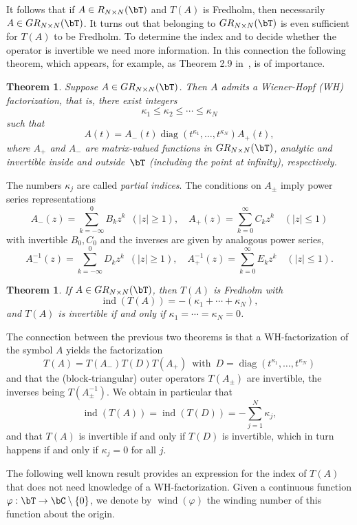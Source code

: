 \documentclass[addpoints,12pt,letter]{article}
\DeclareMathOperator{\diag}{diag}
\DeclareMathOperator{\ind}{ind}
\DeclareMathOperator{\wind}{wind}
\newcommand{\ka}{\kappa}
\newcommand{\nf}{\infty}
\newcommand{\ph}{\varphi}
\newcommand{\sm}{\setminus}
\renewcommand{\ge}{\geqslant}
\renewcommand{\le}{\leqslant}
\numberwithin{equation}{section}
\newtheorem{theorem}[lemma]{Theorem}
\theoremstyle{definition}
\begin{document}
It follows that if $A\in R_{N\times N}(\bT)$ and $T(A)$ is Fredholm, then necessarily $A\in GR_{N\times N}(\bT)$.
It turns out that belonging to $GR_{N\times N}(\bT)$ is even sufficient for $T(A)$ to be Fredholm.
To determine the index and to decide whether the operator is invertible we need more information.
In this connection the following theorem, which appears, for example, as Theorem 2.9 in~\cite{LiSp87}, is of importance.

\begin{theorem}\label{th:WH}
Suppose $A\in GR_{N\times N}(\bT)$.
Then $A$ admits a Wiener-Hopf (WH) factorization, that is, there exist integers
\[
\ka_{1}\le\ka_{2}\le\cdots\le\ka_{N}
\]
such that
\[
A(t)=A_{-}(t)\diag(t^{\ka_{1}},\ldots,t^{\ka_{N}})A_{+}(t),
\]
where $A_{+}$ and $A_{-}$ are matrix-valued functions in $GR_{N \times N}(\bT)$, analytic and invertible inside and outside~$\bT$ (including the point at infinity), respectively.
\end{theorem}

The numbers $\ka_{j}$ are called {\em partial indices}.
The conditions on $A_\pm$ imply power series representations
\[
A_{-}(z)=\sum_{k=-\nf}^{0} B_{k} z^{k} \;\:(|z|\ge 1), \quad A_{+}(z)=\sum_{k=0}^{\nf} C_{k} z^{k} \quad (|z|\le 1)
\]
with invertible $B_{0},C_{0}$ and the inverses are given by analogous power series,
\[
A_{-}^{-1}(z)=\sum_{k=-\nf}^{0} D_{k} z^{k} \;\:(|z|\ge 1), \quad A_{+}^{-1}(z)=\sum_{k=0}^{\nf} E_{k} z^{k} \quad (|z|\le 1).
\]

\begin{theorem}\label{th:inv}
If $A\in GR_{N\times N}(\bT)$, then $T(A)$ is Fredholm with
\[
\ind(T(A))=-(\ka_{1}+\cdots+\ka_N),
\]
and $T(A)$ is invertible if and only if $\ka_{1}=\cdots=\ka_N=0$.
\end{theorem}

The connection between the previous two theorems is that a WH-factorization of the symbol $A$ yields the factorization
\begin{equation}\label{WHO}
T(A)=T(A_{-})T(D)T(A_{+})\;\:\mbox{with}\;\:
D=\diag(t^{\ka_{1}},\ldots,t^{\ka_{N}})
\end{equation}
and that the (block-triangular) outer operators $T(A_\pm)$ are invertible, the inverses being $T(A_\pm^{-1})$.
We obtain in particular that
\[
\ind(T(A))=\ind(T(D))=-\sum_{j=1}^{N}\ka_{j},
\]
and that $T(A)$ is invertible if and only if $T(D)$ is invertible, which in turn happens if and only if $\ka_{j}=0$ for all $j$.

The following well known result provides an expression for the index of $T(A)$ that does not need knowledge of a WH-factorization.
Given a continuous function $\ph: \bT\to\bC \sm \{0\}$, we denote by $\wind(\ph)$ the winding number of this function about the origin.
\end{document}
